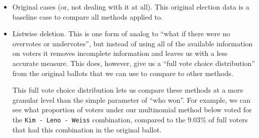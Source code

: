\documentclass[12pt,twoside]{reedthesis}
\begin{document}
\begin{itemize}
\item
  Original cases (or, not dealing with it at all). This original election data is a baseline case to compare all methods applied to.
\item
  Listwise deletion. This is one form of analog to ``what if there were no overvotes or undervotes'', but instead of using all of the available information on voters it removes incomplete information and leaves us with a less accurate measure. This does, however, give us a ``full vote choice distribution'' from the original ballots that we can use to compare to other methods.
  \begin{table}[t]

    \caption[Listwise vote counts]{\label{tab:unnamed-chunk-5}Examination of full voter counts}
    \centering
    \end{table}
  This full vote choice distribution lets us compare these methods at a more granular level than the simple parameter of ``who won''. For example, we can see what proportion of voters under our multinomial method below voted for the \texttt{Kim\ -\ Leno\ -\ Weiss} combination, compared to the 9.03\% of full voters that had this combination in the original ballot.

\end{itemize}
\end{document}
